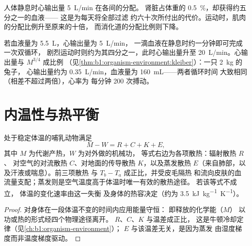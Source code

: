\begin{omfigure}

{\small 人体静息时心输出量 \qty{5}{L/min} 在各间的分配。
肾脏占体重的 \qty{0.5}{\%}，却获得约五分之一的血液——
这是为每天将全部过滤
约六十次所付出的代价。运动时，肌肉的分配比例升至原来的十倍，
而消化道的分配比例则下降。}
\end{omfigure}

\begin{example}[循环时间]\label{ex:b1:mammal-organization:circtime}
若血液量为 \qty{5.5}{L}，心输出量为 \qty{5}{L/min}，
一滴血液在静息时约一分钟即可完成一次双循环，
剧烈运动时则约为其四分之一，此时心输出量升至
\qty{20}{L/min}。心输出量与 $M^{3/4}$ 成比例
（见\cref{thm:b1:organism-environment:kleiber}）：一只 \qty{2}{kg} 的兔子，
心输出量约为 \qty{0.35}{L/min}，血液量为 \qty{160}{mL}——两者循环时间
大致相同（相差不超过两倍），心率为
每分钟 \qty{200}{} 次搏动。
\end{example}

\section{内温性与热平衡}

\begin{proposition}[热量收支]\label{prop:b1:mammal-organization:heatbudget}
处于稳定体温的哺乳动物满足
\[
M - W = R + C + K + E ,
\]
其中 $M$ 为代谢产热，$W$ 为对外做的机械功，
等式右边为各项散热：辐射散热 $R$、
对空气的对流散热 $C$、对地面的传导散热 $K$，以及蒸发散热
$E$（来自肺部，以及汗液或喘息）。前三项散热
与 $T_b - T_a$ 成正比，并受皮毛隔热
和流向皮肤的血流量支配；蒸发则是空气温度高于体温时唯一有效的散热途径。
若该等式不成立，
体温的变化速率由这一失衡
及身体的热容决定（约为
\qty{3.5}{kJ.kg^{-1}.K^{-1}}）。
\end{proposition}
\begin{proof}
对身体在一段体温不变的时间内应用能量守恒：
即释放的化学能（$M$）
以功或热的形式经四个物理途径离开。
$R$、$C$、$K$ 与温差成正比，
这是牛顿冷却定律（见\cref{ch:b1:organism-environment}）；
$E$ 与该温差无关，是因为蒸发
由湿度梯度而非温度梯度驱动。
\end{proof}

